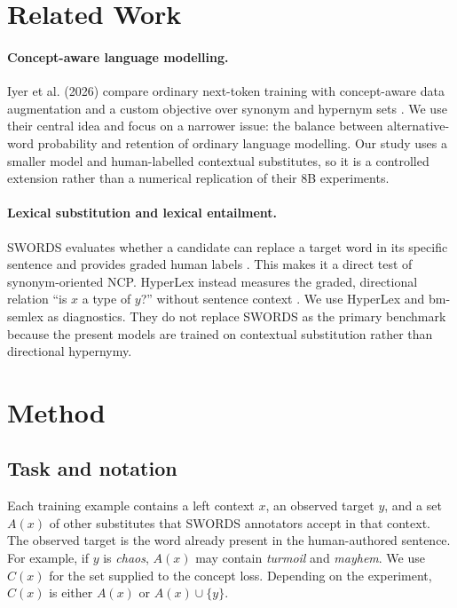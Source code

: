 \documentclass[11pt]{article}
\begin{document}
\section{Related Work}

\paragraph{Concept-aware language modelling.}
Iyer et al. (2026) compare ordinary next-token training with concept-aware data
augmentation and a custom objective over synonym and hypernym sets
\citep{iyer2026beyond}. We use their central idea and focus on a narrower issue:
the balance between alternative-word probability and retention of ordinary
language modelling. Our study uses a smaller model and human-labelled contextual
substitutes, so it is a controlled extension rather than a numerical replication
of their 8B experiments.

\paragraph{Lexical substitution and lexical entailment.}
SWORDS evaluates whether a candidate can replace a target word in its specific
sentence and provides graded human labels \citep{lee2021swords}. This makes it a
direct test of synonym-oriented NCP. HyperLex instead measures the graded,
directional relation ``is $x$ a type of $y$?'' without sentence context
\citep{vulic2017hyperlex}. We use HyperLex and bm-semlex
\citep{ivan2024bmsemlex} as diagnostics. They do not replace SWORDS as the
primary benchmark because the present models are trained on contextual
substitution rather than directional hypernymy.

\section{Method}

\subsection{Task and notation}

Each training example contains a left context $x$, an observed target $y$, and a
set $A(x)$ of other substitutes that SWORDS annotators accept in that context.
The observed target is the word already present in the human-authored sentence.
For example, if $y$ is \emph{chaos}, $A(x)$ may contain \emph{turmoil} and
\emph{mayhem}. We use $C(x)$ for the set supplied to the concept loss. Depending
on the experiment, $C(x)$ is either $A(x)$ or $A(x)\cup\{y\}$.
\end{document}
